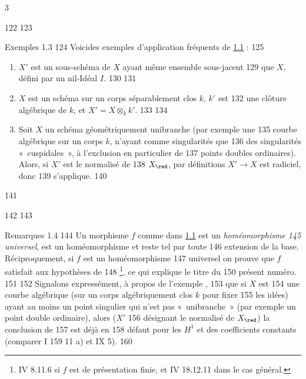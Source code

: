 3	\documentclass[10pt]{../fichiers-configuration-latex/smfart}
\begin{document}
   122	
   123	\begin{enonce*}[remark]{Exemples 1.3}
   124	Voici\pageoriginale  des exemples d'application fréquents de \hyperref[VIII.thm1.1]{1.1} :
   125	\begin{enumerate}
   126	\renewcommand{\theenumi}{\alph{enumi}}
   127	\renewcommand{\labelenumi}{\theenumi)}
   128	\item $X'$ est un sous-schéma de $X$ ayant même ensemble sous-jacent
   129	  que $X$, \ie défini par un nil-Idéal $I$.
   130	
   131	\item $X$ est un schéma sur un corps séparablement clos $k$, $k'$ est
   132	  une clôture algébrique de $k$, et $X'= X \otimes_k k'$.
   133	
   134	\item Soit $X$ un schéma géométriquement unibranche (par exemple une
   135	  courbe algébrique sur un corps $k$, n'ayant comme singularités que
   136	  des singularités « cuspidales », à l'exclusion en particulier de
   137	  points doubles ordinaires). Alors, si $X'$ est le normalisé de
   138	  $X_{\red}$, par définitions $X'\to X$ est radiciel, donc
   139	   s'applique.
   140	\end{enumerate}
   141	\end{enonce*}
   142	
   143	\begin{enonce*}[remark]{Remarques 1.4}
   144	Un morphisme $f$ comme dans \hyperref[VIII.thm1.1]{1.1} est un \emph{homéomorphisme
   145	  universel}, \ie est un homéomorphisme et reste tel par toute
   146	  extension de la base. Réciproquement, si $f$ est un homéomorphisme
   147	  universel on prouve que $f$ satisfait aux hypothèses de 
   148	  \footnote{\Cf \EGA IV 8.11.6 si $f$ est de présentation finie, et 	  IV 18.12.11 dans le cas général.}, ce qui explique le titre du
   150	  présent numéro.
   151	
   152	Signalons expressément, à propos de l'exemple ,
   153	que si $X$ est
   154	une courbe algébrique (sur un corps algébriquement clos $k$ pour fixer
   155	les idées) ayant au moins un point singulier qui n'est pas « unibranche » (par exemple un point double ordinaire), alors ($X'$
   156	désignant le normalisé de $X_{\red}$) la conclusion de 
   157	est déjà en
   158	défaut pour les $H^1$ et des coefficients constants (comparer  I
   159	11 a) et  IX 5).
   160	\end{enonce*}
\end{document}
